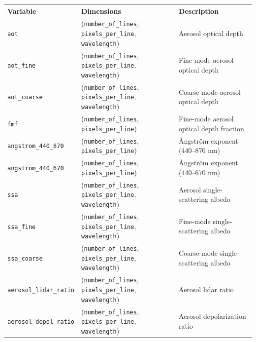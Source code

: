 \documentclass[
  11pt,
  letterpaper,
]{scrreprt}
\begin{document}
\begin{longtable}[]{@{}
  >{\raggedright\arraybackslash}p{}
  >{\raggedright\arraybackslash}p{}
  >{\raggedright\arraybackslash}p{}@{}}
\toprule\noalign{}
\begin{minipage}[b]{\linewidth}\raggedright
Variable
\end{minipage} & \begin{minipage}[b]{\linewidth}\raggedright
Dimensions
\end{minipage} & \begin{minipage}[b]{\linewidth}\raggedright
Description
\end{minipage} \\
\midrule\noalign{}
\endhead
\bottomrule\noalign{}
\endlastfoot
\texttt{aot} & (\texttt{number\_of\_lines}, \texttt{pixels\_per\_line},
\texttt{wavelength}) & Aerosol optical depth \\
\texttt{aot\_fine} & (\texttt{number\_of\_lines},
\texttt{pixels\_per\_line}, \texttt{wavelength}) & Fine-mode aerosol
optical depth \\
\texttt{aot\_coarse} & (\texttt{number\_of\_lines},
\texttt{pixels\_per\_line}, \texttt{wavelength}) & Coarse-mode aerosol
optical depth \\
\texttt{fmf} & (\texttt{number\_of\_lines}, \texttt{pixels\_per\_line})
& Fine-mode aerosol optical depth fraction \\
\texttt{angstrom\_440\_870} & (\texttt{number\_of\_lines},
\texttt{pixels\_per\_line}) & Ångström exponent (440--870 nm) \\
\texttt{angstrom\_440\_670} & (\texttt{number\_of\_lines},
\texttt{pixels\_per\_line}) & Ångström exponent (440--670 nm) \\
\texttt{ssa} & (\texttt{number\_of\_lines}, \texttt{pixels\_per\_line},
\texttt{wavelength}) & Aerosol single-scattering albedo \\
\texttt{ssa\_fine} & (\texttt{number\_of\_lines},
\texttt{pixels\_per\_line}, \texttt{wavelength}) & Fine-mode
single-scattering albedo \\
\texttt{ssa\_coarse} & (\texttt{number\_of\_lines},
\texttt{pixels\_per\_line}, \texttt{wavelength}) & Coarse-mode
single-scattering albedo \\
\texttt{aerosol\_lidar\_ratio} & (\texttt{number\_of\_lines},
\texttt{pixels\_per\_line}, \texttt{wavelength}) & Aerosol lidar
ratio \\
\texttt{aerosol\_depol\_ratio} & (\texttt{number\_of\_lines},
\texttt{pixels\_per\_line}, \texttt{wavelength}) & Aerosol
depolarization ratio \\
\end{longtable}
\end{document}
